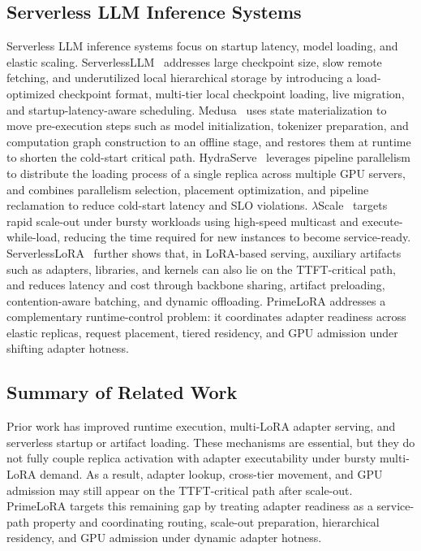 \documentclass[lettersize,journal]{IEEEtran}
\begin{document}
\subsection{Serverless LLM Inference Systems}

Serverless LLM inference systems focus on startup latency, model loading, and elastic scaling. ServerlessLLM~\cite{ServerlessLLM} addresses large checkpoint size, slow remote fetching, and underutilized local hierarchical storage by introducing a load-optimized checkpoint format, multi-tier local checkpoint loading, live migration, and startup-latency-aware scheduling. Medusa~\cite{MedusaServerless} uses state materialization to move pre-execution steps such as model initialization, tokenizer preparation, and computation graph construction to an offline stage, and restores them at runtime to shorten the cold-start critical path. HydraServe~\cite{HydraServeNSDI26} leverages pipeline parallelism to distribute the loading process of a single replica across multiple GPU servers, and combines parallelism selection, placement optimization, and pipeline reclamation to reduce cold-start latency and SLO violations. $\lambda$Scale~\cite{LambdaScale} targets rapid scale-out under bursty workloads using high-speed multicast and execute-while-load, reducing the time required for new instances to become service-ready. ServerlessLoRA~\cite{ServerlessLoRA} further shows that, in LoRA-based serving, auxiliary artifacts such as adapters, libraries, and kernels can also lie on the TTFT-critical path, and reduces latency and cost through backbone sharing, artifact preloading, contention-aware batching, and dynamic offloading. PrimeLoRA addresses a complementary runtime-control problem: it coordinates adapter readiness across elastic replicas, request placement, tiered residency, and GPU admission under shifting adapter hotness.

\subsection{Summary of Related Work}

Prior work has improved runtime execution, multi-LoRA adapter serving, and serverless startup or artifact loading. These mechanisms are essential, but they do not fully couple replica activation with adapter executability under bursty multi-LoRA demand. As a result, adapter lookup, cross-tier movement, and GPU admission may still appear on the TTFT-critical path after scale-out. PrimeLoRA targets this remaining gap by treating adapter readiness as a service-path property and coordinating routing, scale-out preparation, hierarchical residency, and GPU admission under dynamic adapter hotness.
\end{document}

